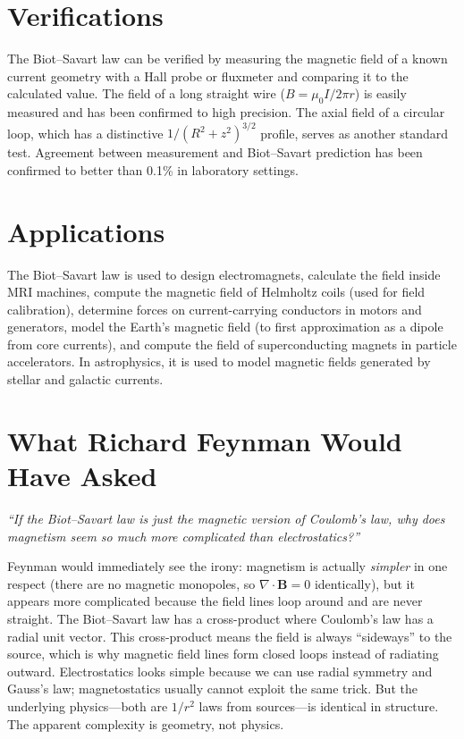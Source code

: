 \documentclass[11pt,openright]{book}
\begin{document}
\section*{Verifications}

The Biot--Savart law can be verified by measuring the magnetic field of a known current geometry with a Hall probe or fluxmeter and comparing it to the calculated value. The field of a long straight wire ($B = \mu_0 I / 2\pi r$) is easily measured and has been confirmed to high precision. The axial field of a circular loop, which has a distinctive $1/(R^2+z^2)^{3/2}$ profile, serves as another standard test. Agreement between measurement and Biot--Savart prediction has been confirmed to better than 0.1\% in laboratory settings.
\section*{Applications}

The Biot--Savart law is used to design electromagnets, calculate the field inside MRI machines, compute the magnetic field of Helmholtz coils (used for field calibration), determine forces on current-carrying conductors in motors and generators, model the Earth's magnetic field (to first approximation as a dipole from core currents), and compute the field of superconducting magnets in particle accelerators. In astrophysics, it is used to model magnetic fields generated by stellar and galactic currents.
\section*{What Richard Feynman Would Have Asked}

\textit{``If the Biot--Savart law is just the magnetic version of Coulomb's law, why does magnetism seem so much more complicated than electrostatics?''}

Feynman would immediately see the irony: magnetism is actually \emph{simpler} in one respect (there are no magnetic monopoles, so $\nabla\cdot\mathbf{B} = 0$ identically), but it appears more complicated because the field lines loop around and are never straight. The Biot--Savart law has a cross-product where Coulomb's law has a radial unit vector. This cross-product means the field is always ``sideways'' to the source, which is why magnetic field lines form closed loops instead of radiating outward. Electrostatics looks simple because we can use radial symmetry and Gauss's law; magnetostatics usually cannot exploit the same trick. But the underlying physics---both are $1/r^2$ laws from sources---is identical in structure. The apparent complexity is geometry, not physics.
\end{document}
